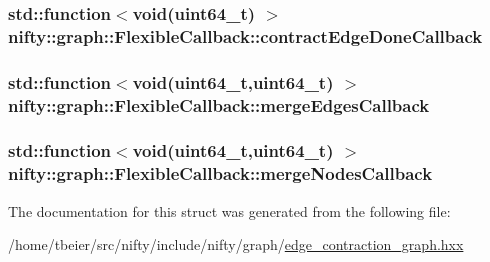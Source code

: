 \subsubsection[{contract\+Edge\+Done\+Callback}]{\setlength{\rightskip}{0pt plus 5cm}std\+::function$<$void(uint64\+\_\+t) $>$ nifty\+::graph\+::\+Flexible\+Callback\+::contract\+Edge\+Done\+Callback}\label{structnifty_1_1graph_1_1FlexibleCallback_a57ddb7dd27b885a94ee81526db535ea7}
\hypertarget{structnifty_1_1graph_1_1FlexibleCallback_af2693627ec37eef058bc9b4e22581e75}{}
\subsubsection[{merge\+Edges\+Callback}]{\setlength{\rightskip}{0pt plus 5cm}std\+::function$<$void(uint64\+\_\+t,uint64\+\_\+t) $>$ nifty\+::graph\+::\+Flexible\+Callback\+::merge\+Edges\+Callback}\label{structnifty_1_1graph_1_1FlexibleCallback_af2693627ec37eef058bc9b4e22581e75}
\hypertarget{structnifty_1_1graph_1_1FlexibleCallback_a4c4b807ea5750a1f894b7e9a6c7598fa}{}
\subsubsection[{merge\+Nodes\+Callback}]{\setlength{\rightskip}{0pt plus 5cm}std\+::function$<$void(uint64\+\_\+t,uint64\+\_\+t) $>$ nifty\+::graph\+::\+Flexible\+Callback\+::merge\+Nodes\+Callback}\label{structnifty_1_1graph_1_1FlexibleCallback_a4c4b807ea5750a1f894b7e9a6c7598fa}


The documentation for this struct was generated from the following file\+:\begin{DoxyCompactItemize}
\item 
/home/tbeier/src/nifty/include/nifty/graph/\hyperlink{graph_2edge__contraction__graph_8hxx}{edge\+\_\+contraction\+\_\+graph.\+hxx}\end{DoxyCompactItemize}
